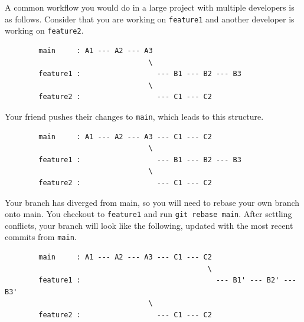     \begin{example}
      \label{ex:updating-feature-branch-with-changes-from-main}
      A common workflow you would do in a large project with multiple developers is as follows. Consider that you are working on \texttt{feature1} and another developer is working on \texttt{feature2}. 
      \begin{lstlisting}
        main     : A1 --- A2 --- A3
                                  \
        feature1 :                  --- B1 --- B2 --- B3
                                  \
        feature2 :                  --- C1 --- C2 
      \end{lstlisting}
      Your friend pushes their changes to \texttt{main}, which leads to this structure. 
      \begin{lstlisting}
        main     : A1 --- A2 --- A3 --- C1 --- C2
                                  \
        feature1 :                  --- B1 --- B2 --- B3
                                  \
        feature2 :                  --- C1 --- C2 
      \end{lstlisting}
      Your branch has diverged from main, so you will need to rebase your own branch onto main. You checkout to \texttt{feature1} and run \texttt{git rebase main}. After settling conflicts, your branch will look like the following, updated with the most recent commits from \texttt{main}. 
      \begin{lstlisting}
        main     : A1 --- A2 --- A3 --- C1 --- C2
                                                \
        feature1 :                                --- B1' --- B2' --- B3'
                                  \
        feature2 :                  --- C1 --- C2 
      \end{lstlisting}
    \end{example}

